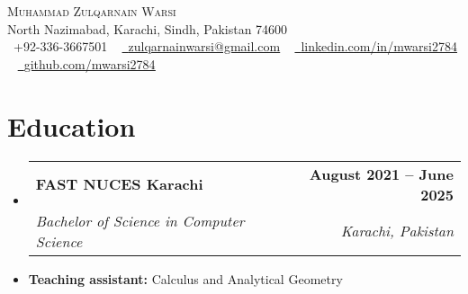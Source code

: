 \documentclass[letterpaper,11pt]{article}
\makeatletter
\newcommand{\resumeItem}[1]{
  \item\small{
    {#1 \vspace{-2pt}}
  }
}
\newcommand{\resumeSubheading}[4]{
  \vspace{-2pt}\item
    \begin{tabular*}{1.0\textwidth}[t]{l@{\extracolsep{\fill}}r}
      \textbf{#1} & \textbf{\small #2} \\
      \textit{\small#3} & \textit{\small #4} \\
    \end{tabular*}\vspace{-7pt}
}
\newcommand{\resumeSubHeadingListStart}{\begin{itemize}[leftmargin=0.0in, label={}]}
\newcommand{\resumeSubHeadingListEnd}{\end{itemize}}
\makeatother
\begin{document}

\begin{center}
    {\Huge \scshape Muhammad Zulqarnain Warsi} \\ \vspace{1pt}
    North Nazimabad, Karachi, Sindh, Pakistan 74600 \\ \vspace{1pt}
    \small \raisebox{-0.1\height}\faPhone\ +92-336-3667501 ~ \href{mailto:zulqarnainwarsi@gmail.com}{\raisebox{-0.2\height}\faEnvelope\  \underline{zulqarnainwarsi@gmail.com}} ~ 
    \href{https://linkedin.com/in/mwarsi2784/}{\raisebox{-0.2\height}\faLinkedin\ \underline{linkedin.com/in/mwarsi2784}}  ~
    \href{https://github.com/mwarsi2784}{\raisebox{-0.2\height}\faGithub\ \underline{github.com/mwarsi2784}}
    \vspace{-8pt}
\end{center}











\section{Education}
  \resumeSubHeadingListStart
    \resumeSubheading
      {FAST NUCES Karachi}{August 2021 -- June 2025}
      {Bachelor of Science in Computer Science}{Karachi, Pakistan}
      \resumeItem{\textbf{Teaching assistant:} Calculus and Analytical Geometry}
  \resumeSubHeadingListEnd










\end{document}
